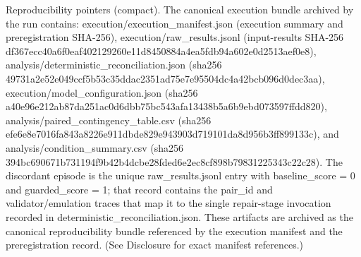\documentclass[conference]{IEEEtran}
\begin{document}
Reproducibility pointers (compact). The canonical execution bundle archived by the run contains: execution/execution\_manifest.json (execution summary and preregistration SHA-256), execution/raw\_results.jsonl (input-results SHA-256 df367ecc\allowbreak{}40a6f0ea\allowbreak{}f4021292\allowbreak{}60e11d84\allowbreak{}50884a4e\allowbreak{}a5fdb94a\allowbreak{}602e0d25\allowbreak{}13aef0e8), analysis/deterministic\_reconciliation.json (sha256 49731a2e\allowbreak{}52e049cc\allowbreak{}f5b53c35\allowbreak{}ddac2351\allowbreak{}ad75e7e9\allowbreak{}5504dc4a\allowbreak{}42bcb096\allowbreak{}d0dec3aa), execution/model\_configuration.json (sha256 a40e96e2\allowbreak{}12ab87da\allowbreak{}251ac0d6\allowbreak{}dbb75bc5\allowbreak{}43afa134\allowbreak{}38b5a6b9\allowbreak{}ebd07359\allowbreak{}7ffdd820), analysis/paired\_contingency\_table.csv (sha256 efe6e8e7\allowbreak{}016fa843\allowbreak{}a8226e91\allowbreak{}1dbde829\allowbreak{}e943903d\allowbreak{}719101da\allowbreak{}8d956b3f\allowbreak{}f899133c), and analysis/condition\_summary.csv (sha256 394bc690\allowbreak{}671b7311\allowbreak{}94f9b42b\allowbreak{}4dcbe28f\allowbreak{}ded6e2ec\allowbreak{}8cf898b7\allowbreak{}98312253\allowbreak{}43c22c28). The discordant episode is the unique raw\_results.jsonl entry with baseline\_score = 0 and guarded\_score = 1; that record contains the pair\_id and validator/emulation traces that map it to the single repair-stage invocation recorded in deterministic\_reconciliation.json. These artifacts are archived as the canonical reproducibility bundle referenced by the execution manifest and the preregistration record. (See Disclosure for exact manifest references.)
\end{document}
